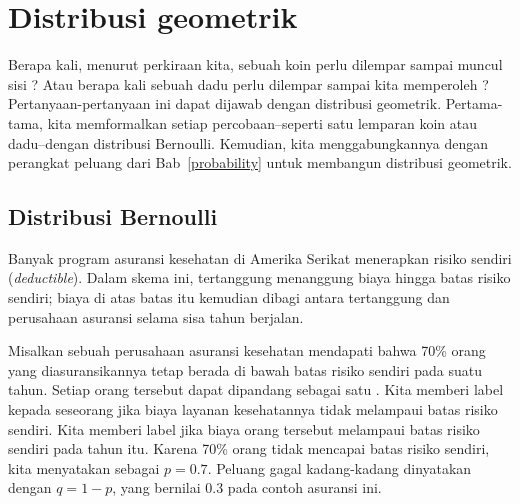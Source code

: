 \section{Distribusi geometrik}
\label{geomDist}

Berapa kali, menurut perkiraan kita, sebuah koin perlu dilempar sampai
muncul sisi ? Atau berapa kali sebuah dadu perlu dilempar
sampai kita memperoleh ? Pertanyaan-pertanyaan ini dapat dijawab
dengan distribusi geometrik. Pertama-tama, kita memformalkan setiap
percobaan--seperti satu lemparan koin atau dadu--dengan distribusi
Bernoulli. Kemudian, kita menggabungkannya dengan perangkat peluang dari
Bab~\ref{probability} untuk membangun distribusi geometrik.

\subsection{Distribusi Bernoulli}
\label{bernoulli}

\newcommand{\insureSprob}{0.7}
\newcommand{\insureSperc}{70\%}
\newcommand{\insureFprob}{0.3}
\newcommand{\insureFperc}{30\%}
\newcommand{\insureDistA}{0.7}
\newcommand{\insureDistB}{0.21}
\newcommand{\insureDistC}{0.063}
\newcommand{\insureDistD}{0.019}
\newcommand{\insureDistE}{0.006}
\newcommand{\insureCDistA}{0.7}
\newcommand{\insureCDistB}{0.91}
\newcommand{\insureCDistC}{0.973}
\newcommand{\insureCDistCComplement}{0.027}
\newcommand{\insureCDistD}{0.992}
\newcommand{\insureCDistE}{0.998}
\newcommand{\insureGeomMean}{1.43}


Banyak program asuransi kesehatan di Amerika Serikat menerapkan
risiko sendiri (\emph{deductible}). Dalam skema ini, tertanggung menanggung
biaya hingga batas risiko sendiri; biaya di atas batas itu kemudian dibagi
antara tertanggung dan perusahaan asuransi selama sisa tahun berjalan.

Misalkan sebuah perusahaan asuransi kesehatan mendapati bahwa
\insureSperc{} orang yang diasuransikannya tetap berada di bawah batas
risiko sendiri pada suatu tahun. Setiap orang tersebut dapat dipandang sebagai
satu . Kita memberi label
 kepada seseorang jika biaya layanan kesehatannya
tidak melampaui batas risiko sendiri. Kita memberi label
 jika biaya orang tersebut melampaui batas risiko
sendiri pada tahun itu. Karena 70\% orang tidak mencapai batas risiko
sendiri, kita menyatakan 
sebagai $p = \insureSprob{}$. Peluang gagal kadang-kadang dinyatakan dengan
$q = 1 - p$, yang bernilai \insureFprob{} pada contoh asuransi ini.

